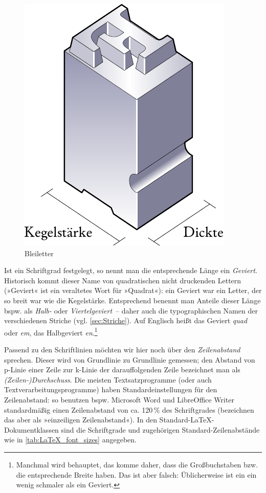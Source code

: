 \begin{figure}
  \centering
  \includegraphics[width=.5\textwidth]{Bleiletter}
  \caption{Bleiletter}
  \label{fig:Bleiletter}
\end{figure}

Ist ein Schriftgrad festgelegt, so nennt man die entsprechende Länge
ein \emph{Geviert}.  Historisch kommt dieser Name von quadratischen
nicht druckenden Lettern (»Geviert« ist ein veraltetes Wort für
»Quadrat«): ein Geviert war ein Letter, der so breit war wie die
Kegelstärke.  Entsprechend benennt man Anteile dieser Länge bspw. als
\emph{Halb-} oder \emph{Viertelgeviert}~-- daher auch die
typographischen Namen der verschiedenen Striche
(vgl. \cref{sec:Striche}).  Auf Englisch heißt das Geviert
\emph{\foreignlanguage{british}{quad}} oder
\emph{\foreignlanguage{british}{em}}, das Halbgeviert
\emph{\foreignlanguage{british}{en}}.\footnote{Manchmal wird
  behauptet, das komme daher, dass die Großbuchstaben 
  bzw.  die entsprechende Breite haben.  Das ist aber falsch:
  Üblicherweise ist ein  ein wenig schmaler als ein Geviert.}

Passend zu den Schriftlinien möchten wir hier noch über den
\emph{Zeilenabstand} sprechen.  Dieser wird von Grundlinie zu
Grundlinie gemessen; den Abstand von p-Linie einer Zeile zur k-Linie
der darauffolgenden Zeile bezeichnet man als
\emph{(Zeilen-)Durchschuss}.  Die meisten Textsatzprogramme (oder auch
Textverarbeitungsprogramme) haben Standardeinstellungen für den
Zeilenabstand: so benutzen bspw. Microsoft Word und LibreOffice Writer
standardmäßig einen Zeilenabstand von ca. 120\,\% des Schriftgrades
(bezeichnen das aber als »einzeiligen Zeilenabstand«).  In den
Standard-\LaTeX-Dokumentklassen sind die Schriftgrade und zugehörigen
Standard-Zeilenabstände wie in \cref{tab:LaTeX_font_sizes} angegeben.

